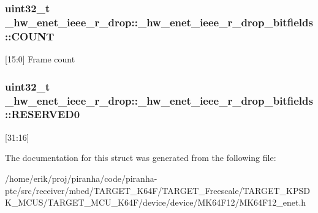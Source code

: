 \subsubsection[{\texorpdfstring{C\+O\+U\+NT}{COUNT}}]{\setlength{\rightskip}{0pt plus 5cm}uint32\+\_\+t \+\_\+hw\+\_\+enet\+\_\+ieee\+\_\+r\+\_\+drop\+::\+\_\+hw\+\_\+enet\+\_\+ieee\+\_\+r\+\_\+drop\+\_\+bitfields\+::\+C\+O\+U\+NT}\hypertarget{struct__hw__enet__ieee__r__drop_1_1__hw__enet__ieee__r__drop__bitfields_a4580fe7d9217f82aa64b958d7102dd4f}{}\label{struct__hw__enet__ieee__r__drop_1_1__hw__enet__ieee__r__drop__bitfields_a4580fe7d9217f82aa64b958d7102dd4f}
\mbox{[}15\+:0\mbox{]} Frame count 
\subsubsection[{\texorpdfstring{R\+E\+S\+E\+R\+V\+E\+D0}{RESERVED0}}]{\setlength{\rightskip}{0pt plus 5cm}uint32\+\_\+t \+\_\+hw\+\_\+enet\+\_\+ieee\+\_\+r\+\_\+drop\+::\+\_\+hw\+\_\+enet\+\_\+ieee\+\_\+r\+\_\+drop\+\_\+bitfields\+::\+R\+E\+S\+E\+R\+V\+E\+D0}\hypertarget{struct__hw__enet__ieee__r__drop_1_1__hw__enet__ieee__r__drop__bitfields_a9a987f8e1306b8edb8f240717b68bdf5}{}\label{struct__hw__enet__ieee__r__drop_1_1__hw__enet__ieee__r__drop__bitfields_a9a987f8e1306b8edb8f240717b68bdf5}
\mbox{[}31\+:16\mbox{]} 

The documentation for this struct was generated from the following file\+:\begin{DoxyCompactItemize}
\item 
/home/erik/proj/piranha/code/piranha-\/ptc/src/receiver/mbed/\+T\+A\+R\+G\+E\+T\+\_\+\+K64\+F/\+T\+A\+R\+G\+E\+T\+\_\+\+Freescale/\+T\+A\+R\+G\+E\+T\+\_\+\+K\+P\+S\+D\+K\+\_\+\+M\+C\+U\+S/\+T\+A\+R\+G\+E\+T\+\_\+\+M\+C\+U\+\_\+\+K64\+F/device/device/\+M\+K64\+F12/M\+K64\+F12\+\_\+enet.\+h\end{DoxyCompactItemize}
